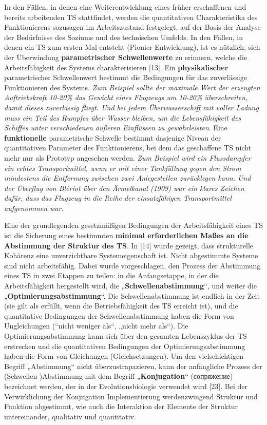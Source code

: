 \documentclass[11pt,a4paper]{article}
\begin{document}
In den Fällen, in denen eine Weiterentwicklung eines früher erschaffenen und
bereits arbeitenden TS stattfindet, werden die quantitativen Charakteristika
des Funktionierens sozusagen im Arbeitszustand festgelegt, auf der Basis der
Analyse der Bedürfnisse des Soziums und des technischen Umfelds. In den
Fällen, in denen ein TS zum ersten Mal entsteht (Pionier-Entwicklung), ist es
nützlich, sich der Überwindung \textbf{parametrischer Schwellenwerte} zu
erinnern, welche die Arbeitsfähigkeit des Systems charakterisieren [13].  Ein
\textbf{physikalischer} parametrischer Schwellenwert bestimmt die Bedingungen
für das zuverlässige Funktionieren des Systems.  \emph{Zum Beispiel sollte der
  maximale Wert der erzeugten Auftriebskraft 10-20\% das Gewicht eines
  Flugzeugs um 10-20\% überschreiten, damit dieses zuverlässig fliegt. Und bei
  jedem Überwasserschiff mit voller Ladung muss ein Teil des Rumpfes über
  Wasser bleiben, um die Lebensfähigkeit des Schiffes unter verschiedenen
  äußeren Einflüssen zu gewährleisten}. Eine \textbf{funktionelle}
parametrische Schwelle bestimmt dasjenige Niveau der quantitativen Parameter
des Funktionierens, bei dem das geschaffene TS nicht mehr nur als Prototyp
angesehen werden. \emph{Zum Beispiel wird ein Flussdampfer ein echtes
  Transportmittel, wenn er mit einer Tankfüllung gegen den Strom mindestens
  die Entfernung zwischen zwei Anlegestellen zurücklegen kann. Und der
  Überflug von Blériot über den Ärmelkanal (1909) war ein klares Zeichen
  dafür, dass das Flugzeug in die Reihe der einsatzfähigen Transportmittel
  aufgenommen war}.

Eine der grundlegenden gesetzmäßigen Bedingungen der Arbeitsfähigkeit eines TS
ist die Sicherung eines bestimmten \textbf{minimal erforderlichen Maßes an die
  Abstimmung der Struktur des TS}. In [14] wurde gezeigt, dass strukturelle
Kohärenz eine unverzichtbare Systemeigenschaft ist.  Nicht abgestimmte Systeme
sind nicht arbeitsfähig. Dabei wurde vorgeschlagen, den Prozess der Abstimmung
eines TS in zwei Etappen zu teilen: in die Anfangsetappe, in der die
Arbeitsfähigkeit hergestellt wird, die „\textbf{Schwellenabstimmung}“, und
weiter die „\textbf{Optimierungsabstimmung}“. Die Schwellenabstimmung ist
endlich in der Zeit (sie gilt als erfüllt, wenn die Betriebsfähigkeit des TS
erreicht ist), und die quantitative Bedingungen der Schwellenabstimmung haben
die Form von Ungleichungen (“nicht weniger als“, „nicht mehr als“).  Die
Optimierungsabstimmung kann sich über den gesamten Lebenszyklus der TS
erstrecken und die quantitativen Bedingungen der Optimierungsabstimmung haben
die Form von Gleichungen (Gleichsetzungen). Um den vielschichtigen Begriff
„Abstimmung“ nicht überzustrapazieren, kann der anfängliche Prozess der
(Schwellen-)Abstimmung mit dem Begriff „\textbf{Konjugation}“
(\foreignlanguage{russian}{сопряжение}) bezeichnet werden, der in der
Evolutionsbiologie verwendet wird [23]. Bei der Verwirklichung der Konjugation
Implementierung werdenzwingend Struktur und Funktion abgestimmt, wie auch die
Interaktion der Elemente der Struktur untereinander, qualitativ und
quantitativ.
\end{document}
